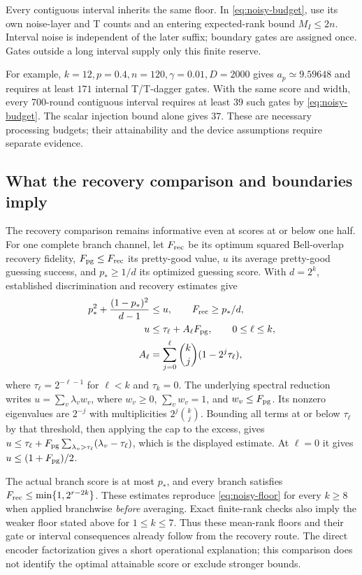 \documentclass[11pt,a4paper]{article}
\begin{document}
Every contiguous interval inherits the same floor. In \eqref{eq:noisy-budget}, use its own noise-layer and T counts and an entering expected-rank bound $M_I\le2n$. Interval noise is independent of the later suffix; boundary gates are assigned once. Gates outside a long interval supply only this finite reserve.

For example, $k=12,p=0.4,n=120,\gamma=0.01,D=2000$ gives $a_p\simeq9.59648$ and requires at least $171$ internal T/T-dagger gates. With the same score and width, every 700-round contiguous interval requires at least $39$ such gates by \eqref{eq:noisy-budget}. The scalar injection bound alone gives $37$. These are necessary processing budgets; their attainability and the device assumptions require separate evidence.

\subsection{What the recovery comparison and boundaries imply}
The recovery comparison remains informative even at scores at or below one half. For one complete branch channel, let $F_{\rm rec}$ be its optimum squared Bell-overlap recovery fidelity, $F_{\rm pg}\le F_{\rm rec}$ its pretty-good value, $u$ its average pretty-good guessing success, and $p_*\ge1/d$ its optimized guessing score. With $d=2^k$, established discrimination and recovery estimates give
\begin{align*}
p_*^2+\frac{(1-p_*)^2}{d-1}&\le u,\qquad F_{\rm rec}\ge p_*/d,\\
u&\le\tau_\ell+A_\ell F_{\rm pg},\qquad 0\le\ell\le k,\\
A_\ell&=\sum_{j=0}^{\ell}\binom kj(1-2^j\tau_\ell),
\end{align*}
where $\tau_\ell=2^{-\ell-1}$ for $\ell<k$ and $\tau_k=0$. The underlying spectral reduction writes $u=\sum_v\lambda_vw_v$, where $w_v\ge0$, $\sum_vw_v=1$, and $w_v\le F_{\rm pg}$. Its nonzero eigenvalues are $2^{-j}$ with multiplicities $2^j\binom kj$. Bounding all terms at or below $\tau_\ell$ by that threshold, then applying the cap to the excess, gives $u\le\tau_\ell+F_{\rm pg}\sum_{\lambda_v>\tau_\ell}(\lambda_v-\tau_\ell)$, which is the displayed estimate. At $\ell=0$ it gives $u\le(1+F_{\rm pg})/2$.

The actual branch score is at most $p_*$, and every branch satisfies $F_{\rm rec}\le\min\{1,2^{r-2k}\}$. These estimates reproduce \eqref{eq:noisy-floor} for every $k\ge8$ when applied branchwise \emph{before} averaging. Exact finite-rank checks also imply the weaker floor stated above for $1\le k\le7$. Thus these mean-rank floors and their gate or interval consequences already follow from the recovery route. The direct encoder factorization gives a short operational explanation; this comparison does not identify the optimal attainable score or exclude stronger bounds.
\end{document}
